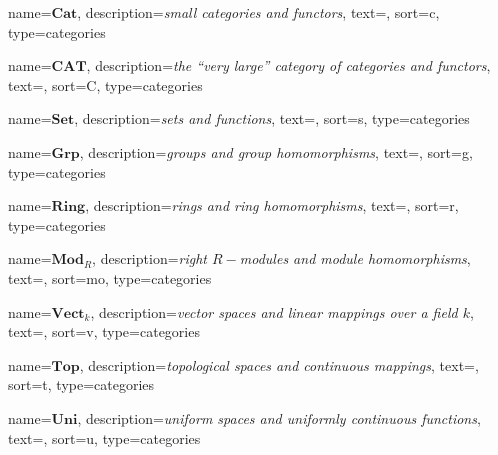 
\DeclareMathOperator{\one}{\mathbf{1}}

  {name=$\mathbf{Cat}$, description=\emph{small categories and functors},
  text={}, sort=c, type=categories}
  \DeclareMathOperator{\Cat}{\gls{Cat}}%

  {name=$\mathbf{CAT}$, description=\emph{the ``very large'' category of categories and functors},
  text={}, sort=C, type=categories}
  \DeclareMathOperator{\CAT}{\gls{CAT}}%

  {name=$\mathbf{Set}$, description=\emph{sets and functions},
  text={}, sort=s, type=categories}
  \DeclareMathOperator{\Set}{\gls{Set}}%

  {name=$\mathbf{Grp}$, description=\emph{groups and group homomorphisms},
  text={}, sort=g, type=categories}
  \DeclareMathOperator{\Grp}{\gls{Grp}}%

  {name=$\mathbf{Ring}$, description=\emph{rings and ring homomorphisms},
  text={}, sort=r, type=categories}
  \DeclareMathOperator{\Ring}{\gls{Ring}}%

  {name=$\mathbf{Mod}_{R}$, description=\emph{right $R-$modules and module homomorphisms},
  text={}, sort=mo, type=categories}
  \DeclareMathOperator{\Mod}{\gls{Module}}%

  {name=$\mathbf{Vect}_{k}$, description=\emph{vector spaces and linear mappings over a field $k$},
  text={}, sort=v, type=categories}
  \DeclareMathOperator{\Vect}{\gls{Vect}}%

  {name=$\mathbf{Top}$, description=\emph{topological spaces and continuous mappings},
  text={}, sort=t, type=categories}
  \DeclareMathOperator{\Top}{\gls{Top}}%

  {name=$\mathbf{Uni}$, description=\emph{uniform spaces and uniformly continuous functions},
  text={}, sort=u, type=categories}
  \DeclareMathOperator{\Uni}{\gls{Uni}}%

